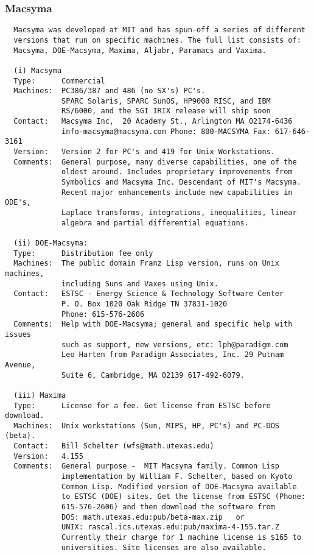 \documentclass[twoside,11pt]{article}
\begin{document}
\subsubsection{Macsyma}
\begin{verbatim}
  Macsyma was developed at MIT and has spun-off a series of different
  versions that run on specific machines. The full list consists of:
  Macsyma, DOE-Macsyma, Maxima, Aljabr, Paramacs and Vaxima.

  (i) Macsyma
  Type:      Commercial
  Machines:  PC386/387 and 486 (no SX's) PC's.
             SPARC Solaris, SPARC SunOS, HP9000 RISC, and IBM
             RS/6000, and the SGI IRIX release will ship soon
  Contact:   Macsyma Inc,  20 Academy St., Arlington MA 02174-6436
             info-macsyma@macsyma.com Phone: 800-MACSYMA Fax: 617-646-3161
  Version:   Version 2 for PC's and 419 for Unix Workstations.
  Comments:  General purpose, many diverse capabilities, one of the
             oldest around. Includes proprietary improvements from
             Symbolics and Macsyma Inc. Descendant of MIT's Macsyma.
             Recent major enhancements include new capabilities in ODE's,
             Laplace transforms, integrations, inequalities, linear
             algebra and partial differential equations.

  (ii) DOE-Macsyma:
  Type:      Distribution fee only
  Machines:  The public domain Franz Lisp version, runs on Unix machines,
             including Suns and Vaxes using Unix.
  Contact:   ESTSC - Energy Science & Technology Software Center
             P. O. Box 1020 Oak Ridge TN 37831-1020
             Phone: 615-576-2606
  Comments:  Help with DOE-Macsyma; general and specific help with issues
             such as support, new versions, etc: lph@paradigm.com
             Leo Harten from Paradigm Associates, Inc. 29 Putnam Avenue,
             Suite 6, Cambridge, MA 02139 617-492-6079.

  (iii) Maxima
  Type:      License for a fee. Get license from ESTSC before download.
  Machines:  Unix workstations (Sun, MIPS, HP, PC's) and PC-DOS (beta).
  Contact:   Bill Schelter (wfs@math.utexas.edu)
  Version:   4.155
  Comments:  General purpose -  MIT Macsyma family. Common Lisp
             implementation by William F. Schelter, based on Kyoto
             Common Lisp. Modified version of DOE-Macsyma available
             to ESTSC (DOE) sites. Get the license from ESTSC (Phone:
             615-576-2606) and then download the software from
             DOS: math.utexas.edu:pub/beta-max.zip   or
             UNIX: rascal.ics.utexas.edu:pub/maxima-4-155.tar.Z
             Currently their charge for 1 machine license is $165 to
             universities. Site licenses are also available.


\end{verbatim}
\end{document}
